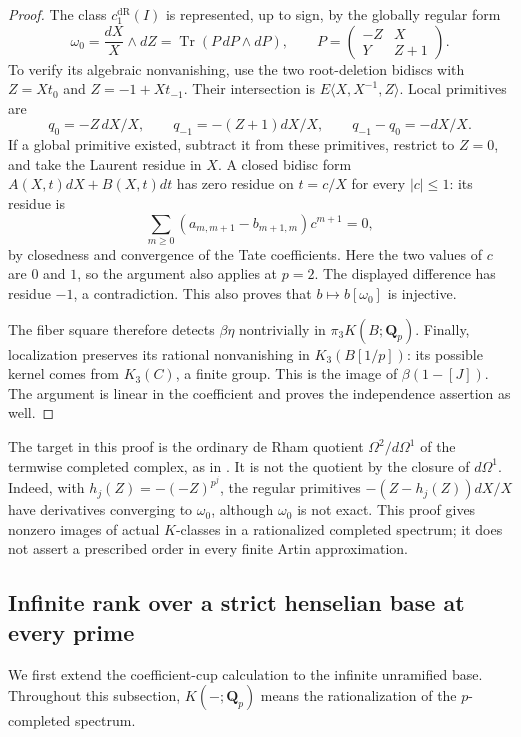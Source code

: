 \begin{proof}
The class $c_1^{\mathrm{dR}}(I)$ is represented, up to sign, by the
globally regular form
\[
 \omega_0=\frac{dX}{X}\wedge dZ
 =\operatorname{Tr}(P\,dP\wedge dP),\qquad
 P=\begin{pmatrix}-Z&X\\Y&Z+1\end{pmatrix}.
\]
To verify its algebraic nonvanishing, use the two root-deletion
bidiscs with $Z=Xt_0$ and $Z=-1+Xt_{-1}$. Their intersection is
$E\langle X,X^{-1},Z\rangle$. Local primitives are
\[
 q_0=-Z\,dX/X,\qquad q_{-1}=-(Z+1)dX/X,
 \qquad q_{-1}-q_0=-dX/X.
\]
If a global primitive existed, subtract it from these primitives,
restrict to $Z=0$, and take the Laurent residue in $X$. A closed
bidisc form $A(X,t)dX+B(X,t)dt$ has zero residue on $t=c/X$ for
every $|c|\le1$: its residue is
\[
 \sum_{m\ge0}(a_{m,m+1}-b_{m+1,m})c^{m+1}=0,
\]
by closedness and convergence of the Tate coefficients. Here the
two values of $c$ are $0$ and $1$, so the argument also applies at
$p=2$. The displayed difference has residue $-1$, a contradiction.
This also proves that $b\mapsto b[\omega_0]$ is injective.

The fiber square therefore detects $\beta\eta$ nontrivially in
$\pi_3K(B;\mathbf Q_p)$. Finally, localization preserves its rational
nonvanishing in $K_3(B[1/p])$: its possible kernel comes from
$K_3(C)$, a finite group. This is the image of $\beta(1-[J])$.
The argument is linear in the coefficient and proves the independence
assertion as well.
\end{proof}

\begin{remark}
The target in this proof is the ordinary de Rham quotient
$\Omega^2/d\Omega^1$ of the termwise completed complex, as in
\cite[Constructions~4.6 and~4.11]{AMMN}. It is not the quotient by
the closure of $d\Omega^1$. Indeed, with
$h_j(Z)=-(-Z)^{p^j}$, the regular primitives
$-(Z-h_j(Z))dX/X$ have derivatives converging to $\omega_0$, although
$\omega_0$ is not exact. This proof gives nonzero images of actual
$K$-classes in a rationalized completed spectrum; it does not assert
a prescribed order in every finite Artin approximation.
\end{remark}


\subsection{Infinite rank over a strict henselian base at every prime}
\label{d3:sec:directtcstrictallprimes}

We first extend the coefficient-cup calculation to the infinite
unramified base. Throughout this subsection, $K(-;\mathbf Q_p)$ means
the rationalization of the $p$-completed spectrum.

